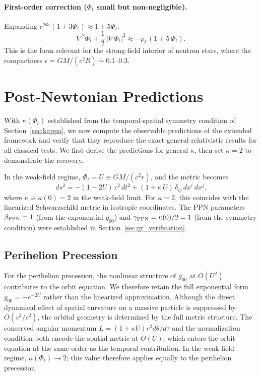 \documentclass[12pt]{article}
\begin{document}
\paragraph{First-order correction ($\Phi_t$ small but non-negligible).}

Expanding $e^{2\Phi_t}(1+3\Phi_t) \approx 1 + 5\Phi_t$:
$$
\nabla^2\Phi_t + \frac{1}{2}\,|\nabla\Phi_t|^2 \approx -\rho_t\,(1 + 5\,\Phi_t).
$$
This is the form relevant for the strong-field interior of neutron stars, where the compactness $\epsilon = GM/(c^2 R) \sim 0.1\text{--}0.3$.


\section{Post-Newtonian Predictions}
\label{sec:post_newtonian}

With $\kappa(\Phi_t)$ established from the temporal-spatial symmetry condition of Section~\ref{sec:kappa}, we now compute the observable predictions of the extended framework and verify that they reproduce the exact general-relativistic results for all classical tests. We first derive the predictions for general $\kappa$, then set $\kappa = 2$ to demonstrate the recovery.

In the weak-field regime, $\Phi_t = U \equiv GM/(c^2 r)$, and the metric becomes
\begin{equation}
ds^2 = -(1 - 2U)\,c^2\,dt^2 + (1 + \kappa\,U)\,\delta_{ij}\,dx^i\,dx^j.
\label{eq:pn_metric}
\end{equation}
where $\kappa \equiv \kappa(0) = 2$ in the weak-field limit. For $\kappa = 2$, this coincides with the linearized Schwarzschild metric in isotropic coordinates. The PPN parameters $\beta_{\rm PPN} = 1$ (from the exponential $g_{00}$) and $\gamma_{\rm PPN} = \kappa(0)/2 = 1$ (from the symmetry condition) were established in Section~\ref{sec:gr_verification}.

\subsection{Perihelion Precession}
\label{sec:perihelion}

For the perihelion precession, the nonlinear structure of $g_{00}$ at $O(U^2)$ contributes to the orbit equation. We therefore retain the full exponential form $g_{00} = -e^{-2U}$ rather than the linearized approximation. Although the direct dynamical effect of spatial curvature on a massive particle is suppressed by $O(v^2/c^2)$, the orbital geometry is determined by the full metric structure. The conserved angular momentum $L = (1+\kappa U)r^2 d\theta/d\tau$ and the normalization condition both encode the spatial metric at $O(U)$, which enters the orbit equation at the same order as the temporal contribution. In the weak-field regime, $\kappa(\Phi_t) \to 2$; this value therefore applies equally to the perihelion precession.
\end{document}
